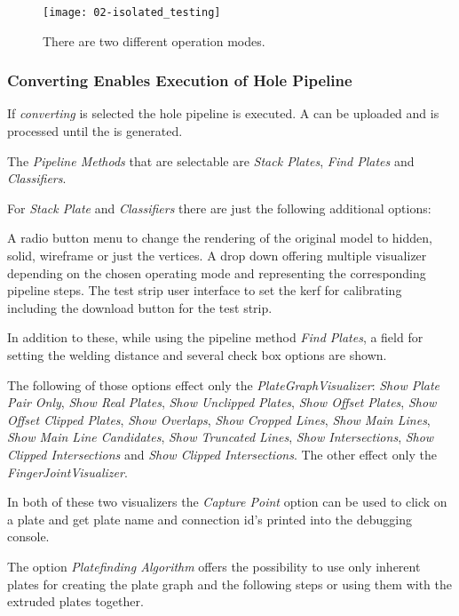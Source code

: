 \documentclass[../ClassicThesis.tex]{subfiles}
\begin{document}
\begin{figure}
  \centering
  \texttt{[image: 02-isolated\_testing]}
  \caption{There are two different operation modes.}
  \label{fig:isolated_testing}
\end{figure}

\subsubsection{Converting Enables Execution of Hole Pipeline}

If \emph{converting} is selected the hole pipeline is executed. A \threedmodel can be uploaded and is processed until the \svgfile{} is generated.

The \emph{Pipeline Methods} that are selectable are \emph{Stack Plates}, \emph{Find Plates} and \emph{Classifiers}.

For \emph{Stack Plate} and \emph{Classifiers} there are just the following additional options:

A radio button menu to change the rendering of the original model to hidden, solid, wireframe or just the vertices. A drop down offering multiple visualizer depending on the chosen operating mode and representing the corresponding pipeline steps. The test strip user interface to set the kerf for calibrating including the download button for the test strip.

In addition to these, while using the pipeline method \emph{Find Plates}, a field for setting the welding distance and several check box options are shown.

The following of those options effect only the \emph{PlateGraphVisualizer}: \emph{Show Plate Pair Only}, \emph{Show Real Plates}, \emph{Show Unclipped Plates}, \emph{Show Offset Plates}, \emph{Show Offset Clipped Plates}, \emph{Show Overlaps}, \emph{Show Cropped Lines}, \emph{Show Main Lines}, \emph{Show Main Line Candidates}, \emph{Show Truncated Lines}, \emph{Show Intersections}, \emph{Show Clipped Intersections} and \emph{Show Clipped Intersections}. The other effect only the \emph{FingerJointVisualizer}.

In both of these two visualizers the \emph{Capture Point} option can be used to click on a plate and get plate name and connection id's printed into the debugging console.

The option \emph{Platefinding Algorithm} offers the possibility to use only inherent plates for creating the plate graph and the following steps or using them with the extruded plates together.
\end{document}
